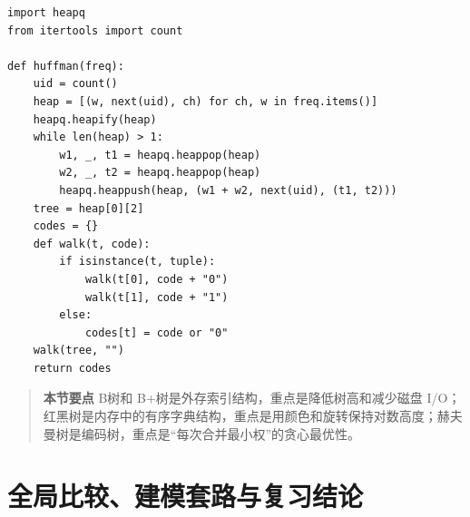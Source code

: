 \documentclass[UTF8,oneside,12pt]{ctexbook}
\newenvironment{summarybox}{\begin{quote}\small\noindent\textbf{本节要点}\quad}{\end{quote}}
\begin{document}
\begin{lstlisting}
import heapq
from itertools import count

def huffman(freq):
    uid = count()
    heap = [(w, next(uid), ch) for ch, w in freq.items()]
    heapq.heapify(heap)
    while len(heap) > 1:
        w1, _, t1 = heapq.heappop(heap)
        w2, _, t2 = heapq.heappop(heap)
        heapq.heappush(heap, (w1 + w2, next(uid), (t1, t2)))
    tree = heap[0][2]
    codes = {}
    def walk(t, code):
        if isinstance(t, tuple):
            walk(t[0], code + "0")
            walk(t[1], code + "1")
        else:
            codes[t] = code or "0"
    walk(tree, "")
    return codes
\end{lstlisting}

\begin{summarybox}
B树和 B+树是外存索引结构，重点是降低树高和减少磁盘 I/O；红黑树是内存中的有序字典结构，重点是用颜色和旋转保持对数高度；赫夫曼树是编码树，重点是“每次合并最小权”的贪心最优性。
\end{summarybox}

\chapter{全局比较、建模套路与复习结论}
\end{document}

